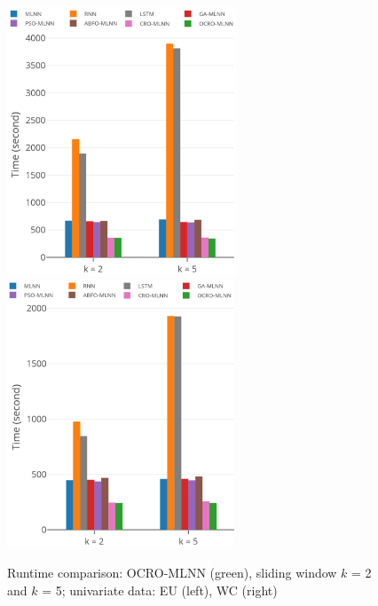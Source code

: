 \documentclass[11pt,twoside]{article}
\begin{document}
\begin{multicols}{2}
\begin{figure}[!t]
	\centering
	\begin{minipage}[t]{1.0\textwidth}
		\centering
		\includegraphics[width=0.45\textwidth =0cm 0cm 0cm 0cm, height = 8cm]{time/time_eu.pdf}
		\centering
		\includegraphics[width=0.45\textwidth =0cm 0cm 0cm 0cm, height = 8cm]{time/time_wc.pdf}
	\end{minipage}
	\caption{Runtime comparison: OCRO-MLNN (green), sliding window $k$ = 2 and $k$ = 5; univariate data: EU (left), WC (right)} 
	\label{fig:speed_system_univariate}
\end{figure}


\end{multicols}
\end{document}

